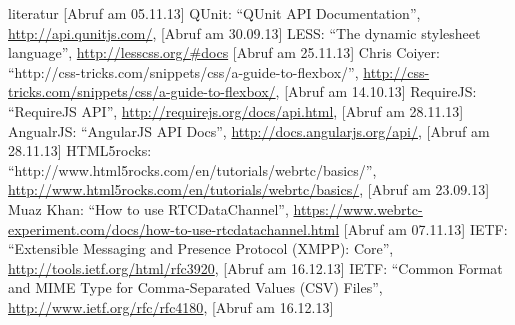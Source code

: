 \begin{thebibliography}{literatur}
		[Abruf am 05.11.13]
	 QUnit: %
		"`QUnit API Documentation"',
		\hyperlink{http://api.qunitjs.com/}{http://api.qunitjs.com/},
		[Abruf am 30.09.13]
	 LESS:
		"`The dynamic stylesheet language"',
		\hyperlink{http://lesscss.org/\#docs}{http://lesscss.org/\#docs}
		[Abruf am 25.11.13]
	 Chris Coiyer:
		"`http://css-tricks.com/snippets/css/a-guide-to-flexbox/"',
		\hyperlink{http://css-tricks.com/snippets/css/a-guide-to-flexbox/}{http://css-tricks.com/snippets/css/a-guide-to-flexbox/},
		[Abruf am 14.10.13]
	 RequireJS:
		"`RequireJS API"',
		\hyperlink{http://requirejs.org/docs/api.html}{http://requirejs.org/docs/api.html},
		[Abruf am 28.11.13]
	 AngualrJS:
		"`AngularJS API Docs"',
		\hyperlink{http://docs.angularjs.org/api/}{http://docs.angularjs.org/api/},
		[Abruf am 28.11.13]
	 HTML5rocks:
		"`http://www.html5rocks.com/en/tutorials/webrtc/basics/"',
		\hyperlink{http://www.html5rocks.com/en/tutorials/webrtc/basics/}{http://www.html5rocks.com/en/tutorials/webrtc/basics/},
		[Abruf am 23.09.13]
	 Muaz Khan:
		"`How to use RTCDataChannel"',
		\hyperlink{https://www.webrtc-experiment.com/docs/how-to-use-rtcdatachannel.html}{https://www.webrtc-experiment.com/docs/how-to-use-rtcdatachannel.html}
		[Abruf am 07.11.13]
	 IETF:
		"`Extensible Messaging and Presence Protocol (XMPP): Core"',
		\hyperlink{http://tools.ietf.org/html/rfc3920}{http://tools.ietf.org/html/rfc3920},
		[Abruf am 16.12.13]
	 IETF:
		"`Common Format and MIME Type for Comma-Separated Values (CSV) Files"',
		\hyperlink{http://www.ietf.org/rfc/rfc4180}{http://www.ietf.org/rfc/rfc4180},
		[Abruf am 16.12.13]
\end{thebibliography}


\appendix




















